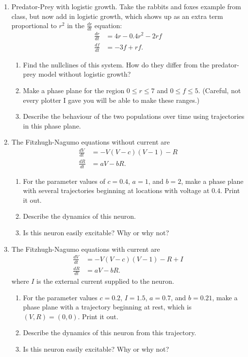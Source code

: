 \documentclass{article}
\begin{document}
\begin{enumerate}
  \item Predator-Prey with logistic growth. Take the rabbits and foxes example from class, but now add in logistic growth, which shows up as an extra term proportional to $r^2$ in the $\frac{dr}{dt}$ equation:
    \begin{align*}
      \frac{dr}{dt} &= 4 r - 0.4 r^2 - 2 r f\\
      \frac{df}{dt} &= -3f + rf.
    \end{align*}
    \begin{enumerate}
      \item Find the nullclines of this system. How do they differ from the predator-prey model without logistic growth?
      \item 
	Make a phase plane for the region $0 \leq r \leq 7$ and $0\leq f \leq 5$. (Careful, not every plotter I gave you will be able to make these ranges.)
      \item Describe the behaviour of the two populations over time using trajectories in this phase plane.
  \end{enumerate}

  \item The Fitzhugh-Nagumo equations without current are
    \begin{align*}
      \frac{dV}{dt} &= - V(V-c)(V-1) - R \\
      \frac{dR}{dt} &= a V - b R.
    \end{align*}

	\begin{enumerate}
	  \item For the parameter values of $c=0.4$, $a = 1$, and $b= 2$, make a phase plane with several trajectories beginning at locations with voltage at $0.4$. Print it out.
	  \item Describe the dynamics of this neuron. 
	  \item Is this neuron easily excitable? Why or why not?
	\end{enumerate}

  \item The Fitzhugh-Nagumo equations with current are
    \begin{align*}
      \frac{dV}{dt} &= - V(V-c)(V-1) - R + I\\
      \frac{dR}{dt} &= a V - b R.
    \end{align*}
    where $I$ is the external current supplied to the neuron. 
    \begin{enumerate}
      \item For the parameter values $c = 0.2$, $I = 1.5$, $a = 0.7$, and $b = 0.21$, make a phase plane with a trajectory beginning at rest, which is $(V,R) = (0,0)$. Print it out.
	\item Describe the dynamics of this neuron from this trajectory.
	\item Is this neuron easily excitable? Why or why not?
    \end{enumerate}
\end{enumerate}
\end{document}

